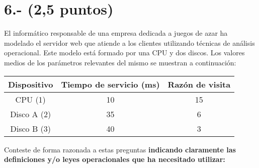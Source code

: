 \documentclass[a4paper,12pt]{article}
\begin{document}
\section*{6.- (2,5 puntos)}
El informático responsable de una empresa dedicada a juegos de azar ha modelado el servidor web que atiende a los clientes utilizando técnicas de análisis operacional. Este modelo está formado por una CPU y dos discos. Los valores medios de los parámetros relevantes del mismo se muestran a continuación:

\begin{center}
\begin{tabular}{|c|c|c|}
\hline
\textbf{Dispositivo} & \textbf{Tiempo de servicio (ms)} & \textbf{Razón de visita} \\
\hline
CPU (1) & 10 & 15 \\
Disco A (2) & 35 & 6 \\
Disco B (3) & 40 & 3 \\
\hline
\end{tabular}
\end{center}

Conteste de forma razonada a estas preguntas \textbf{indicando claramente las definiciones y/o leyes operacionales que ha necesitado utilizar:}
\end{document}

